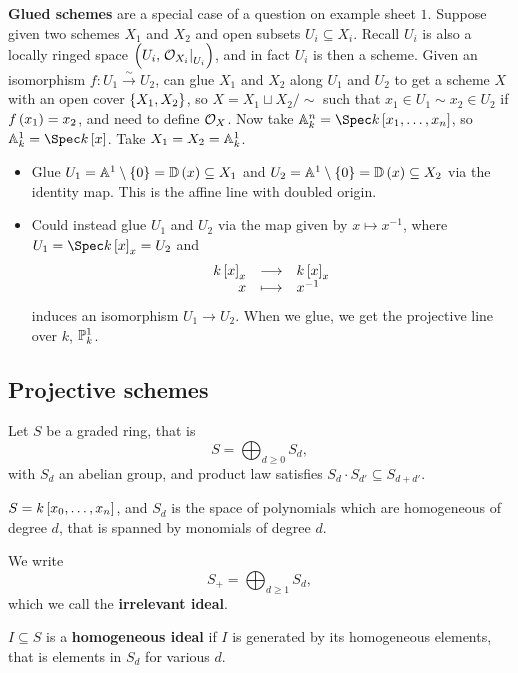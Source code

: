 \begin{example*}
\textbf{Glued schemes} are a special case of a question on example sheet $ 1 $. Suppose given two schemes $ X_1 $ and $ X_2 $ and open subsets $ U_i \subseteq X_i $. Recall $ U_i $ is also a locally ringed space $ \br{U_i, \eval{\OOO_{X_i}}_{U_i}} $, and in fact $ U_i $ is then a scheme. Given an isomorphism $ f : U_1 \xrightarrow{\sim} U_2 $, can glue $ X_1 $ and $ X_2 $ along $ U_1 $ and $ U_2 $ to get a scheme $ X $ with an open cover $ \cbr{X_1, X_2} $, so $ X = X_1 \sqcup X_2 / \sim $ such that $ x_1 \in U_1 \sim x_2 \in U_2 $ if $ f\br{x_1} = x_2 $, and need to define $ \OOO_X $. Now take $ \AA_k^n = \Spec k\sbr{x_1, \dots, x_n} $, so $ \AA_k^1 = \Spec k\sbr{x} $. Take $ X_1 = X_2 = \AA_k^1 $.
\begin{itemize}
\item Glue $ U_1 = \AA^1 \setminus \cbr{0} = \DD\br{x} \subseteq X_1 $ and $ U_2 = \AA^1 \setminus \cbr{0} = \DD\br{x} \subseteq X_2 $ via the identity map. This is the affine line with doubled origin.
\item Could instead glue $ U_1 $ and $ U_2 $ via the map given by $ x \mapsto x^{-1} $, where $ U_1 = \Spec k\sbr{x}_x = U_2 $ and
$$ \function{k\sbr{x}_x}{k\sbr{x}_x}{x}{x^{-1}} $$
induces an isomorphism $ U_1 \to U_2 $. When we glue, we get the projective line over $ k $, $ \PP_k^1 $.
\end{itemize}
\end{example*}

\subsection{Projective schemes}

Let $ S $ be a graded ring, that is
$$ S = \bigoplus_{d \ge 0} S_d, $$
with $ S_d $ an abelian group, and product law satisfies $ S_d \cdot S_{d'} \subseteq S_{d + d'} $.

\begin{example*}
$ S = k\sbr{x_0, \dots, x_n} $, and $ S_d $ is the space of polynomials which are homogeneous of degree $ d $, that is spanned by monomials of degree $ d $.
\end{example*}

We write
$$ S_+ = \bigoplus_{d \ge 1} S_d, $$
which we call the \textbf{irrelevant ideal}.

\begin{definition*}
$ I \subseteq S $ is a \textbf{homogeneous ideal} if $ I $ is generated by its homogeneous elements, that is elements in $ S_d $ for various $ d $.
\end{definition*}

